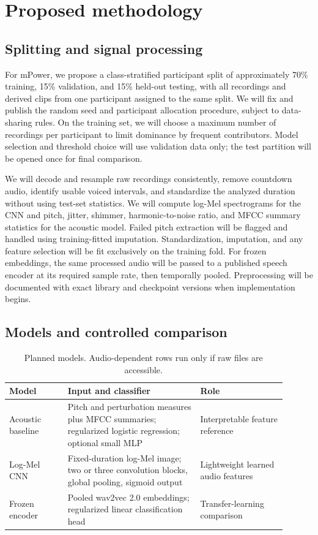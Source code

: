 \documentclass{article}
\begin{document}
\section{Proposed methodology}
\subsection{Splitting and signal processing}
For mPower, we propose a class-stratified participant split of approximately 70\% training, 15\% validation, and 15\% held-out testing, with all recordings and derived clips from one participant assigned to the same split. We will fix and publish the random seed and participant allocation procedure, subject to data-sharing rules. On the training set, we will choose a maximum number of recordings per participant to limit dominance by frequent contributors. Model selection and threshold choice will use validation data only; the test partition will be opened once for final comparison.

We will decode and resample raw recordings consistently, remove countdown audio, identify usable voiced intervals, and standardize the analyzed duration without using test-set statistics. We will compute log-Mel spectrograms for the CNN and pitch, jitter, shimmer, harmonic-to-noise ratio, and MFCC summary statistics for the acoustic model. Failed pitch extraction will be flagged and handled using training-fitted imputation. Standardization, imputation, and any feature selection will be fit exclusively on the training fold. For frozen embeddings, the same processed audio will be passed to a published speech encoder at its required sample rate, then temporally pooled. Preprocessing will be documented with exact library and checkpoint versions when implementation begins.

\subsection{Models and controlled comparison}
\begin{table}[t]
\caption{Planned models. Audio-dependent rows run only if raw files are accessible.}
\label{tab:models}
\centering
\small
\begin{tabular}{p{0.19\linewidth}p{0.43\linewidth}p{0.28\linewidth}}
\toprule
Model & Input and classifier & Role \\
\midrule
Acoustic baseline & Pitch and perturbation measures plus MFCC summaries; regularized logistic regression; optional small MLP & Interpretable feature reference \\
Log-Mel CNN & Fixed-duration log-Mel image; two or three convolution blocks, global pooling, sigmoid output & Lightweight learned audio features \\
Frozen encoder & Pooled wav2vec 2.0 embeddings; regularized linear classification head & Transfer-learning comparison \\
\bottomrule
\end{tabular}
\end{table}
\end{document}
